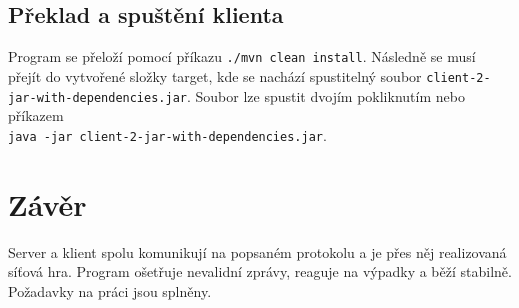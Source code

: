 \documentclass[12pt, a4paper]{article} %
\begin{document}
	\subsection{Překlad a spuštění klienta}
	\par Program se přeloží pomocí příkazu \texttt{./mvn clean install}. Následně se musí přejít do vytvořené složky target, kde se nachází spustitelný soubor \texttt{client-2-jar-with-dependencies.jar}. Soubor lze spustit dvojím pokliknutím nebo příkazem \\ \texttt{java -jar client-2-jar-with-dependencies.jar}.
	\section{Závěr}
	\par Server a klient spolu komunikují na popsaném protokolu a je přes něj realizovaná síťová hra. Program ošetřuje nevalidní zprávy, reaguje na výpadky a běží stabilně. Požadavky na práci jsou splněny.
	
\end{document}
